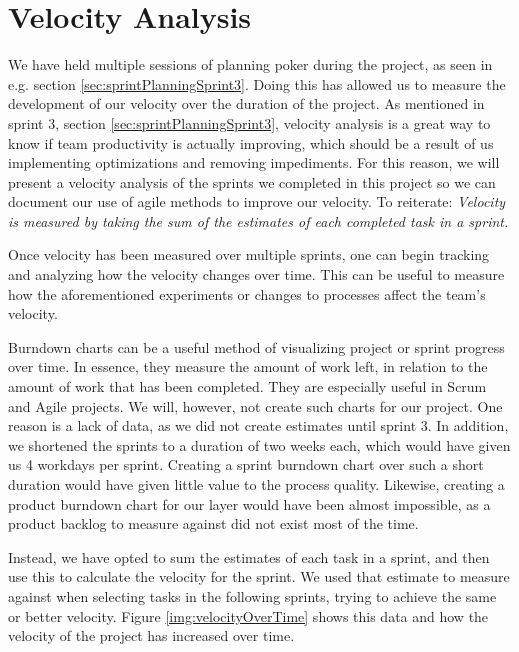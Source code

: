 \section{Velocity Analysis}\label{sec:velocityAnalysis}
We have held multiple sessions of planning poker during the project, as seen in e.g. section \ref{sec:sprintPlanningSprint3}.
Doing this has allowed us to measure the development of our velocity over the duration of the project. As mentioned in sprint 3, section \ref{sec:sprintPlanningSprint3}, velocity analysis is a great way to know if team productivity is actually improving, which should be a result of us implementing optimizations and removing impediments. For this reason, we will present a velocity analysis of the sprints we completed in this project so we can document our use of agile methods to improve our velocity.
To reiterate: \textit{Velocity is measured by taking the sum of the estimates of each completed task in a sprint\cite{sutherlandScrumArtDoing2014}.}

Once velocity has been measured over multiple sprints, one can begin tracking and analyzing how the velocity changes over time. This can be useful to measure how the aforementioned experiments or changes to processes affect the team's velocity.

Burndown charts can be a useful method of visualizing project or sprint progress over time. In essence, they measure the amount of work left, in relation to the amount of work that has been completed. They are especially useful in Scrum and Agile projects\cite{HowCreateBurndown2021}. We will, however, not create such charts for our project. One reason is a lack of data, as we did not create estimates until sprint 3.
In addition, we shortened the sprints to a duration of two weeks each, which would have given us 4 workdays per sprint. Creating a sprint burndown chart over such a short duration would have given little value to the process quality.
Likewise, creating a product burndown chart for our layer would have been almost impossible, as a product backlog to measure against did not exist most of the time.

Instead, we have opted to sum the estimates of each task in a sprint, and then use this to calculate the velocity for the sprint. We used that estimate to measure against when selecting tasks in the following sprints, trying to achieve the same or better velocity. Figure \ref{img:velocityOverTime} shows this data and how the velocity of the project has increased over time.

